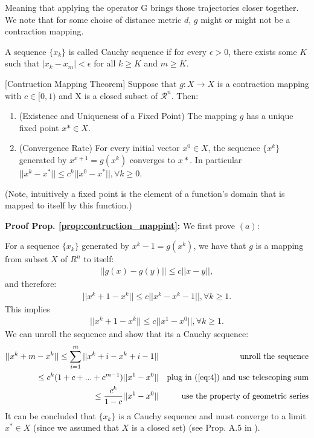 \documentclass{article}
\begin{document}
Meaning that applying the operator G brings those trajectories closer together. We note that for some choise of distance metric $d$, $g$ might or might not be a contraction mapping.

\begin{defn}
   A sequence $\{x_k\}$ is called Cauchy sequence if for every $\epsilon > 0$, there exists some $K$ such that $|x_k-x_m|< \epsilon$ for all $k\geq K$ and $m\geq K$.
\end{defn}

\begin{prop} \label{prop:contruction_mappint}[Contruction Mapping Theorem]
Suppose that $g:X\rightarrow X$ is a contraction mapping with $c \in [0,1)$ and X is a closed subset of $\mathcal{R}^n$. Then:
\renewcommand{\labelenumi}{(\alph{enumi})}
\begin{enumerate}
    \item (Existence and Uniqueness of a Fixed Point) The mapping $g$ has a unique fixed point $x*\in X$.
    \item (Convergence Rate) For every initial vector $x^0 \in X$, the sequence $\{x^k\}$ generated by $x^{x+1}=g(x^k)$ converges to $x*$. In particular $||x^k-x^*|| \leq c^k||x^0-x^*||, \forall k \geq 0$.
\end{enumerate}
\end{prop}
(Note, intuitively a fixed point is the element of a function's domain that is mapped to itself by this function.)

\textbf{Proof Prop. \ref{prop:contruction_mappint}:} 
We first prove $(a)$:

For a sequence $\{x_k\}$ generated by $x^k-1 = g(x^k)$, we have that $g$ is a mapping from subset $X$ of $R^n$ to itself:
\begin{align}
    ||g(x) - g(y)|| \leq c||x-y||,
\end{align}
and therefore:
\begin{align}
    ||x^k+1 - x^k|| \leq c||x^k-x^k-1||, \forall k\geq1.
\end{align}
This implies 
\begin{align}\label{eq:4} 
    ||x^k+1 - x^k|| \leq c||x^1-x^0||, \forall k\geq1.
\end{align}
We can unroll the sequence and show that its a Cauchy sequence:
\begin{align*}
    ||x^k+m - x^k|| \leq  \sum_{i=1}^m  ||x^k+i - x^k+i-1|| && \text{unroll the sequence}\\
    \leq c^k(1+c+...+c^{m-1})||x^1-x^0|| && \text{plug in (\ref{eq:4}) and use telescoping sum}\\
    \leq \frac{c^k}{1-c}||x^1-x^0|| && \text{use the property of geometric series}
\end{align*}
It can be concluded that $\{x_k\}$ is a Cauchy sequence and must converge to a limit $x^* \in X$ (since we assumed that $X$ is a closed set) (see Prop. A.5 in \cite{Bertsekas/99}).
\end{document}
